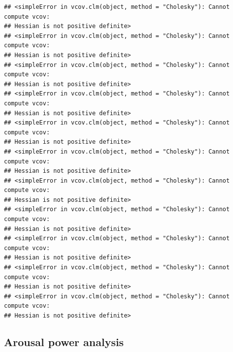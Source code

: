 \documentclass[
  bookmarksnumbered]{article}
\newenvironment{Shaded}{\begin{snugshade}}{\end{snugshade}}
\newcommand{\AttributeTok}[1]{\textcolor[rgb]{0.80,0.80,0.80}{#1}}
\newcommand{\CommentTok}[1]{\textcolor[rgb]{0.50,0.62,0.50}{#1}}
\newcommand{\FunctionTok}[1]{\textcolor[rgb]{0.94,0.94,0.56}{#1}}
\newcommand{\NormalTok}[1]{\textcolor[rgb]{0.80,0.80,0.80}{#1}}
\newcommand{\OtherTok}[1]{\textcolor[rgb]{0.94,0.94,0.56}{#1}}
\newcommand{\SpecialCharTok}[1]{\textcolor[rgb]{0.86,0.64,0.64}{#1}}
\newcommand{\StringTok}[1]{\textcolor[rgb]{0.80,0.58,0.58}{#1}}
\begin{document}
\begin{verbatim}
## <simpleError in vcov.clm(object, method = "Cholesky"): Cannot compute vcov: 
## Hessian is not positive definite>
## <simpleError in vcov.clm(object, method = "Cholesky"): Cannot compute vcov: 
## Hessian is not positive definite>
## <simpleError in vcov.clm(object, method = "Cholesky"): Cannot compute vcov: 
## Hessian is not positive definite>
## <simpleError in vcov.clm(object, method = "Cholesky"): Cannot compute vcov: 
## Hessian is not positive definite>
## <simpleError in vcov.clm(object, method = "Cholesky"): Cannot compute vcov: 
## Hessian is not positive definite>
## <simpleError in vcov.clm(object, method = "Cholesky"): Cannot compute vcov: 
## Hessian is not positive definite>
## <simpleError in vcov.clm(object, method = "Cholesky"): Cannot compute vcov: 
## Hessian is not positive definite>
## <simpleError in vcov.clm(object, method = "Cholesky"): Cannot compute vcov: 
## Hessian is not positive definite>
## <simpleError in vcov.clm(object, method = "Cholesky"): Cannot compute vcov: 
## Hessian is not positive definite>
## <simpleError in vcov.clm(object, method = "Cholesky"): Cannot compute vcov: 
## Hessian is not positive definite>
## <simpleError in vcov.clm(object, method = "Cholesky"): Cannot compute vcov: 
## Hessian is not positive definite>
\end{verbatim}

\begin{Shaded}
\end{Shaded}

\hypertarget{arousal-power-analysis}{%
\subsection{Arousal power analysis}\label{arousal-power-analysis}}
\end{document}
